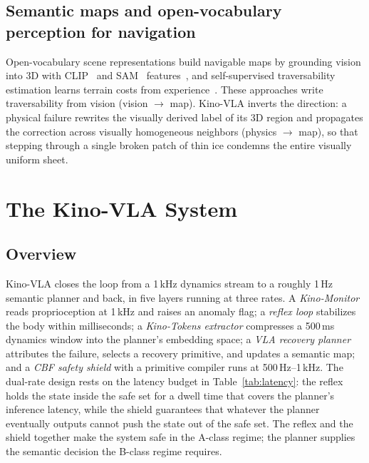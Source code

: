 \documentclass[conference]{IEEEtran}
\newcommand{\kinovla}{Kino-VLA}
\newcommand{\kinotokens}{Kino-Tokens}
\begin{document}
\subsection{Semantic maps and open-vocabulary perception for navigation}
Open-vocabulary scene representations build navigable maps by grounding vision into
3D with CLIP~\cite{radford2021clip} and SAM~\cite{kirillov2023sam} features~\cite{huang2023vlmaps,huang2023voxposer,chen2023nlmap},
and self-supervised traversability estimation learns terrain costs from
experience~\cite{frey2023wvn}. These approaches write traversability from vision
(vision $\rightarrow$ map). \kinovla{} inverts the direction: a physical failure
rewrites the visually derived label of its 3D region and propagates the correction
across visually homogeneous neighbors (physics $\rightarrow$ map), so that stepping
through a single broken patch of thin ice condemns the entire visually uniform
sheet.

\section{The \kinovla{} System}
\label{sec:method}

\subsection{Overview}
\kinovla{} closes the loop from a \mbox{1\,kHz} dynamics stream to a roughly
\mbox{1\,Hz} semantic planner and back, in five layers running at three rates. A
\emph{Kino-Monitor} reads proprioception at \mbox{1\,kHz} and raises an anomaly
flag; a \emph{reflex loop} stabilizes the body within milliseconds; a
\emph{\kinotokens{} extractor} compresses a \mbox{500\,ms} dynamics window into
the planner's embedding space; a \emph{VLA recovery planner} attributes the
failure, selects a recovery primitive, and updates a semantic map; and a
\emph{CBF safety shield} with a primitive compiler runs at \mbox{500\,Hz}--\mbox{1\,kHz}.
The dual-rate design rests on the latency budget in Table~\ref{tab:latency}: the
reflex holds the state inside the safe set for a dwell time that covers the
planner's inference latency, while the shield guarantees that whatever the planner
eventually outputs cannot push the state out of the safe set. The reflex and the
shield together make the system safe in the A-class regime; the planner supplies
the semantic decision the B-class regime requires.
\end{document}
